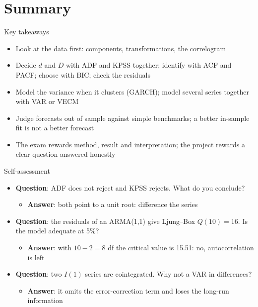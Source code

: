 \section{Summary}

\begin{frame}{Key takeaways}
\itemsize{\small}
\begin{itemize}
    \item Look at the data first: components, transformations, the correlogram
    \item Decide $d$ and $D$ with ADF and KPSS together; identify with ACF and PACF; choose with BIC; check the residuals
    \item Model the variance when it clusters (GARCH); model several series together with VAR or VECM
    \item Judge forecasts out of sample against simple benchmarks; a better in-sample fit is not a better forecast
    \item The exam rewards method, result and interpretation; the project rewards a clear question answered honestly
\end{itemize}
\end{frame}

\begin{frame}{Self-assessment}
\itemsize{\small}
\begin{itemize}
    \item \textbf{Question}: ADF does not reject and KPSS rejects. What do you conclude?
    \begin{itemize}
        \item \textbf{Answer}: both point to a unit root: difference the series
    \end{itemize}
    \item \textbf{Question}: the residuals of an ARMA(1,1) give Ljung--Box $Q(10) = 16$. Is the model adequate at 5\%?
    \begin{itemize}
        \item \textbf{Answer}: with $10 - 2 = 8$ df the critical value is 15.51: no, autocorrelation is left
    \end{itemize}
    \item \textbf{Question}: two $I(1)$ series are cointegrated. Why not a VAR in differences?
    \begin{itemize}
        \item \textbf{Answer}: it omits the error-correction term and loses the long-run information
    \end{itemize}
\end{itemize}
\end{frame}


